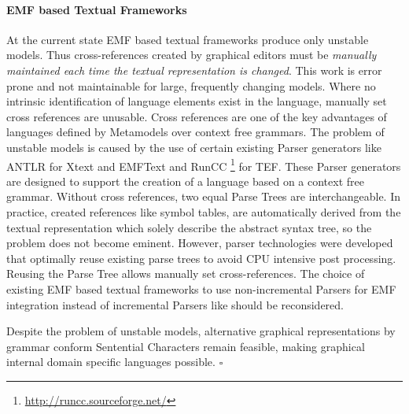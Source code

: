 \paragraph{EMF based Textual Frameworks}
At the current state EMF based textual frameworks produce only unstable models. Thus cross-references created by graphical editors must be \emph{manually maintained each time the textual representation is changed}. This work is error prone and not maintainable for large, frequently changing models. Where no intrinsic identification of language elements exist in the language, manually set cross references are unusable. Cross references are one of the key advantages of languages defined by Metamodels over context free grammars. The problem of unstable models is caused by the use of certain existing Parser generators like ANTLR for Xtext and EMFText and RunCC \footnote{\raggedright \url{http://runcc.sourceforge.net/}} for TEF. These Parser generators are designed to support the creation of a language based on a context free grammar.
Without cross references, two equal Parse Trees are interchangeable. In practice, created references like symbol tables, are automatically derived from the textual representation which solely describe the abstract syntax tree, so the problem does not become eminent. However, parser technologies were developed that optimally reuse existing parse trees to avoid CPU intensive post processing. Reusing the Parse Tree allows manually set cross-references. The choice of existing EMF based textual frameworks to use non-incremental Parsers for EMF integration instead of incremental Parsers like \cite{xglr} should be reconsidered.

Despite the problem of unstable models, alternative graphical representations by grammar conform Sentential Characters remain feasible, making graphical internal domain specific languages possible. 
$\square$
